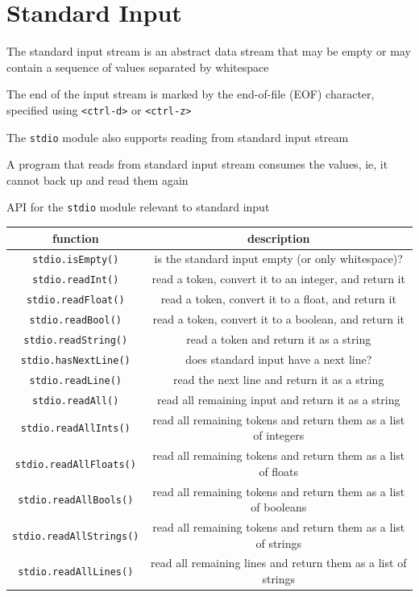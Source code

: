 \documentclass[8pt,a4paper,compress]{beamer}
\begin{document}
\section{Standard Input}
\begin{frame}[fragile]
\pause

The standard input stream is an abstract data stream that may be empty or may contain a sequence of values separated by whitespace 

\pause
\bigskip

The end of the input stream is marked by the end-of-file (EOF) character, specified using \lstinline$<ctrl-d>$ or \lstinline$<ctrl-z>$ 

\pause
\bigskip

The \lstinline{stdio} module also supports reading from standard input stream

\pause
\bigskip

A program that reads from standard input stream consumes the values, ie, it cannot back up and read them again
\end{frame}

\begin{frame}[fragile]
\pause

API for the \lstinline{stdio} module relevant to standard input
\begin{center}
\begin{tabular}{cc}
function & description \\ \hline
\lstinline$stdio.isEmpty()$ & is the standard input empty (or only whitespace)? \\
\lstinline$stdio.readInt()$ & read a token, convert it to an integer, and return it \\
\lstinline$stdio.readFloat()$ & read a token, convert it to a float, and return it \\
\lstinline$stdio.readBool()$ & read a token, convert it to a boolean, and return it \\
\lstinline$stdio.readString()$ & read a token and return it as a string \\
\lstinline$stdio.hasNextLine()$ & does standard input have a next line? \\
\lstinline$stdio.readLine()$ & read the next line and return it as a string \\
\lstinline$stdio.readAll()$ & read all remaining input and return it as a string \\
\lstinline$stdio.readAllInts()$ & read all remaining tokens and return them as a list of integers \\
\lstinline$stdio.readAllFloats()$ & read all remaining tokens and return them as a list of floats \\
\lstinline$stdio.readAllBools()$ & read all remaining tokens and return them as a list of booleans \\
\lstinline$stdio.readAllStrings()$ & read all remaining tokens and return them as a list of strings \\
\lstinline$stdio.readAllLines()$ & read all remaining lines and return them as a list of strings
\end{tabular} 
\end{center}
\end{frame}
\end{document}
